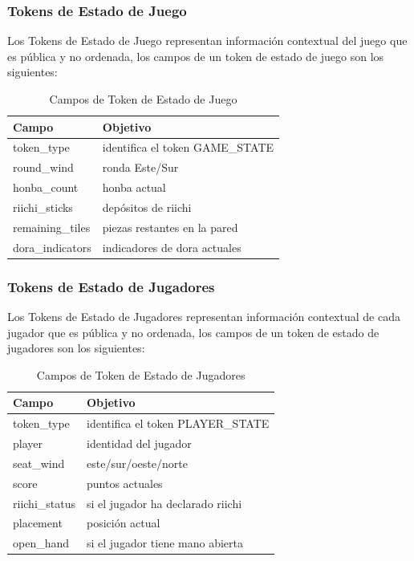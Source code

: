 \subsubsection{Tokens de Estado de Juego}

Los Tokens de Estado de Juego representan información contextual del juego que es pública y no ordenada, los campos de un token de estado de juego son los siguientes:


\begin{table}[H]
  \centering
  \begin{tabular}{|l|l|}
    \hline
    \textbf{Campo} & \textbf{Objetivo}         \\ \hline
    token\_type    & identifica el token GAME\_STATE    \\ \hline
    round\_wind      & ronda Este/Sur            \\ \hline
    honba\_count     & honba actual               \\ \hline
    riichi\_sticks   & depósitos de riichi             \\ \hline
    remaining\_tiles  & piezas restantes en la pared          \\ \hline
    dora\_indicators & indicadores de dora actuales     \\ \hline
  \end{tabular}
  \caption{Campos de Token de Estado de Juego}
  \label{tab:game_state_token}
\end{table}

\subsubsection{Tokens de Estado de Jugadores}

Los Tokens de Estado de Jugadores representan información contextual de cada jugador que es pública y no ordenada, los campos de un token de estado de jugadores son los siguientes:


\begin{table}[H]
  \centering
  \begin{tabular}{|l|l|}
    \hline
    \textbf{Campo} & \textbf{Objetivo}         \\ \hline
    token\_type    & identifica el token PLAYER\_STATE    \\ \hline
    player          & identidad del jugador                   \\ \hline
    seat\_wind      & este/sur/oeste/norte          \\ \hline
    score           & puntos actuales                 \\ \hline
    riichi\_status  & si el jugador ha declarado riichi \\ \hline
    placement       & posición actual                \\ \hline
    open\_hand      & si el jugador tiene mano abierta \\ \hline
  \end{tabular}
  \caption{Campos de Token de Estado de Jugadores}
  \label{tab:player_state_token}
\end{table}

